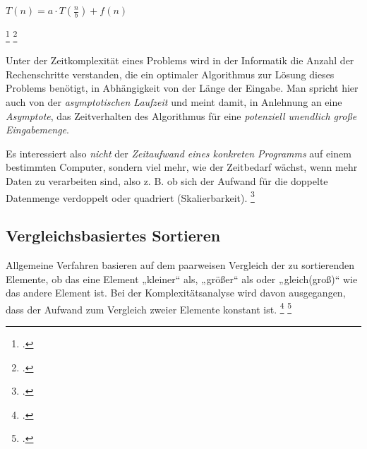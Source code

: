 \documentclass{lehramt-informatik-haupt}
\begin{document}
$T(n) = a \cdot T(\frac{n}{b}) + f(n)$

\footcite{wiki:master-theorem}
\footcite[Seite 19-35 (PDF 11-24)]{aud:fs:2}

%

\begin{exkurs}%
Unter der Zeitkomplexität eines Problems wird in der Informatik die
Anzahl der Rechenschritte verstanden, die ein optimaler Algorithmus zur
Lösung dieses Problems benötigt, in Abhängigkeit von der Länge der
Eingabe. Man spricht hier auch von der \emph{asymptotischen Laufzeit}
und meint damit, in Anlehnung an eine \emph{Asymptote}, das
Zeitverhalten des Algorithmus für eine \emph{potenziell unendlich große
Eingabemenge}.

Es interessiert also \emph{nicht} der \emph{Zeitaufwand eines konkreten
Programms} auf einem bestimmten Computer, sondern viel mehr, wie der
Zeitbedarf wächst, wenn mehr Daten zu verarbeiten sind, also z. B. ob
sich der Aufwand für die doppelte Datenmenge verdoppelt oder quadriert
(Skalierbarkeit).
\footcite{wiki:zeitkomplexitaet}
\end{exkurs}

\subsection{Vergleichsbasiertes Sortieren}

Allgemeine Verfahren basieren auf dem paarweisen Vergleich der zu
sortierenden Elemente, ob das eine Element „kleiner“ als, „größer“ als
oder „gleich(groß)“ wie das andere Element ist. Bei der
Komplexitätsanalyse wird davon ausgegangen, dass der Aufwand zum
Vergleich zweier Elemente konstant ist.
\footcite{wiki:sortierverfahren}
\footcite[Seite 35 (PDF 24)]{aud:fs:2}
\end{document}
